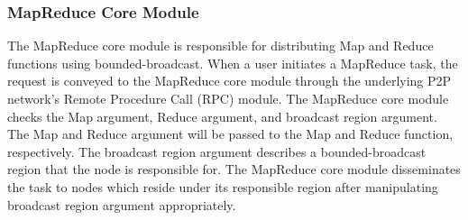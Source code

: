 \documentclass{acm_proc_article-sp}
\begin{document}
\subsubsection{MapReduce Core Module}
The MapReduce core module is responsible for distributing Map and Reduce functions using bounded-broadcast. 
When a user initiates a MapReduce task, the request is conveyed to the MapReduce core module through the underlying P2P network's Remote Procedure Call (RPC) module. 
The MapReduce core module checks the Map argument, Reduce argument, and broadcast region argument. 
The Map and Reduce argument will be passed to the Map and Reduce function, respectively. 
The broadcast region argument describes a bounded-broadcast region that the node is responsible for. 
The MapReduce core module disseminates the task to nodes which reside under its responsible region after manipulating broadcast region argument appropriately.
\end{document}
